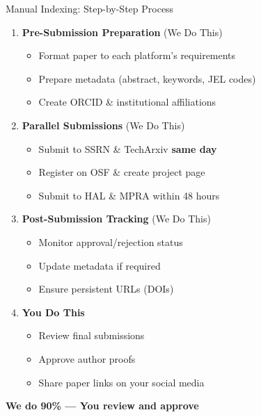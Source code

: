 \documentclass[10pt, aspectratio=169]{beamer}
\begin{document}
	\begin{frame}{Manual Indexing: Step-by-Step Process}
		\begin{enumerate}
			\item \textbf{Pre-Submission Preparation} (We Do This)
			\begin{itemize}
				\item Format paper to each platform's requirements
				\item Prepare metadata (abstract, keywords, JEL codes)
				\item Create ORCID \& institutional affiliations
			\end{itemize}
			
			\item \textbf{Parallel Submissions} (We Do This)
			\begin{itemize}
				\item Submit to SSRN \& TechArxiv \textbf{same day}
				\item Register on OSF \& create project page
				\item Submit to HAL \& MPRA within 48 hours
			\end{itemize}
			
			\item \textbf{Post-Submission Tracking} (We Do This)
			\begin{itemize}
				\item Monitor approval/rejection status
				\item Update metadata if required
				\item Ensure persistent URLs (DOIs)
			\end{itemize}
			
			\item \textbf{You Do This}
			\begin{itemize}
				\item Review final submissions
				\item Approve author proofs
				\item Share paper links on your social media
			\end{itemize}
		\end{enumerate}
		
		\begin{center}
			\textcolor{myblue}{\textbf{We do 90\% — You review and approve}}
		\end{center}
	\end{frame}
	
	
\end{document}
